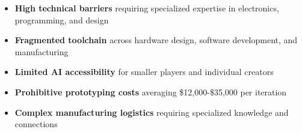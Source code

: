 \begin{tcolorbox}[
    colback=fabLight!30,
    colframe=fabRed,
    arc=4pt,
    boxrule=1pt,
    title={\textbf{Market Barriers \& Challenges}},
    fonttitle=\large,
    coltitle=fabRed
]

\begin{multicols}{2}
\begin{itemize}
    \item[\textcolor{fabRed}{\faExclamationTriangle}] \textbf{High technical barriers} requiring specialized expertise in electronics, programming, and design
    \item[\textcolor{fabRed}{\faPuzzlePiece}] \textbf{Fragmented toolchain} across hardware design, software development, and manufacturing
    \item[\textcolor{fabRed}{\faLock}] \textbf{Limited AI accessibility} for smaller players and individual creators
    \item[\textcolor{fabRed}{\faDollar}] \textbf{Prohibitive prototyping costs} averaging \$12,000-\$35,000 per iteration
    \item[\textcolor{fabRed}{\faIndustry}] \textbf{Complex manufacturing logistics} requiring specialized knowledge and connections
\end{itemize}
\end{multicols}
\end{tcolorbox}

\vspace{0.8cm}

